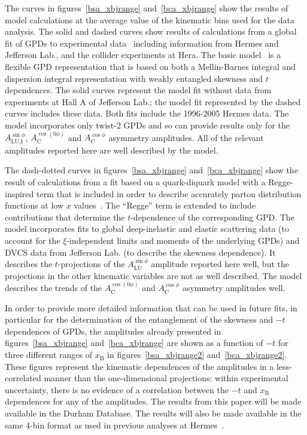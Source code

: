 \documentclass[11pt,a4paper]{article}
\begin{document}
The curves in  figures~\ref{bsa_xbjrange} and~\ref{bca_xbjrange} show the results of model calculations at the average value of the kinematic bins used for the data analysis. The solid and dashed curves show results of calculations from a global fit of GPDs to experimental data~\cite{Kum09} including information from H{\sc ermes} and Jefferson Lab., and the collider experiments at H{\sc era}. The basic model~\cite{Mue05,Kum07,Kum08} is a flexible GPD representation that is based on both a Mellin-Barnes integral and dispersion integral representation with weakly entangled skewness and $t$ dependences. The solid curves represent the model fit without data from experiments \cite{Cam06} at Hall A of Jefferson Lab.; the model fit represented by the dashed curves includes these data. Both fits include the 1996-2005 H{\sc ermes} data. The model incorporates only twist-2 GPDs and so can provide results only for the $A_{\textrm{LU,I}}^{\sin\phi}$, $A_{\textrm{C}}^{\cos(0\phi)}$ and $A_{\textrm{C}}^{\cos\phi}$ asymmetry amplitudes. All of the relevant amplitudes reported here are well described by the model.

The dash-dotted curves in figures~\ref{bsa_xbjrange} and~\ref{bca_xbjrange} show the result of calculations from a fit based on a quark-diquark model with a Regge-inspired term that is included in order to describe accurately parton distribution functions at low $x$ values~\cite{Liu11}. The ``Regge'' term is extended to include contributions that determine the $t$-dependence of the corresponding GPD. The model incorporates fits to global deep-inelastic and elastic scattering data (to account for the $\xi$-independent limits and moments of the underlying GPDs) and DVCS data from Jefferson Lab. (to describe the skewness dependence). It describes the $t$-projections of the $A^{\sin\phi}_{\textrm{LU}}$ amplitude reported here well, but the projections in the other kinematic variables are not as well described. The model describes the trends of the $A_{\textrm{C}}^{\cos(0\phi)}$ and $A_{\textrm{C}}^{\cos\phi}$ asymmetry amplitudes well.

In order to provide more detailed information that can be used in future fits, in particular for the determination of the entanglement of the skewness and $-t$ dependences of GPDs, the amplitudes already presented in figures~\ref{bsa_xbjrange} and~\ref{bca_xbjrange} are shown as a function of $-t$ for three different ranges of $x_{\textrm{B}}$ in figures~\ref{bsa_xbjrange2} and~\ref{bca_xbjrange2}. These figures represent the kinematic dependences of the amplitudes in a less-correlated manner than the one-dimensional projections: within experimental uncertainty, there is no evidence of a correlation between the $-t$ and $x_{\textrm{B}}$ dependences for any of the amplitudes. The results from this paper will be made available in the Durham Database. The results will also be made available in the same 4-bin format as used in previous analyses at H{\sc ermes}~\cite{Air08,Air09,Air10b}.
\end{document}
